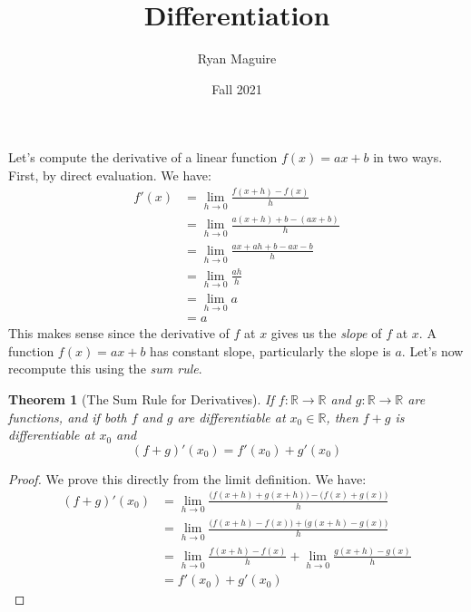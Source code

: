 \documentclass{article}
\title{Differentiation}
\author{Ryan Maguire}
\date{Fall 2021}
\theoremstyle{normal}
\theoremstyle{plain}
\newtheorem{theorem}{Theorem}
\begin{document}
    \maketitle
    Let's compute the derivative of a linear function $f(x)=ax+b$ in two ways.
    First, by direct evaluation. We have:
    \begin{align}
        f'(x)&=\lim_{h\rightarrow{0}}\frac{f(x+h)-f(x)}{h}\\
            &=\lim_{h\rightarrow{0}}\frac{a(x+h)+b-(ax+b)}{h}\\
            &=\lim_{h\rightarrow{0}}\frac{ax+ah+b-ax-b}{h}\\
            &=\lim_{h\rightarrow{0}}\frac{ah}{h}\\
            &=\lim_{h\rightarrow{0}}a\\
            &=a
    \end{align}
    This makes sense since the derivative of $f$ at $x$ gives us the
    \textit{slope} of $f$ at $x$. A function $f(x)=ax+b$ has constant slope,
    particularly the slope is $a$. Let's now recompute this using the
    \textit{sum rule}.
    \par\hfill\par
    \begin{theorem}[The Sum Rule for Derivatives]
        If $f:\mathbb{R}\rightarrow\mathbb{R}$ and
        $g:\mathbb{R}\rightarrow\mathbb{R}$ are functions, and if both
        $f$ and $g$ are differentiable at $x_{0}\in\mathbb{R}$, then
        $f+g$ is differentiable at $x_{0}$ and
        \begin{equation}
            (f+g)'(x_{0})=f'(x_{0})+g'(x_{0})
        \end{equation}
    \end{theorem}
    \begin{proof}
        We prove this directly from the limit definition. We have:
        \begin{align}
            (f+g)'(x_{0})
                &=\lim_{h\rightarrow{0}}
                    \frac{\big(f(x+h)+g(x+h)\big)-\big(f(x)+g(x)\big)}{h}\\
                &=\lim_{h\rightarrow{0}}
                    \frac{\big(f(x+h)-f(x)\big)+\big(g(x+h)-g(x)\big)}{h}\\
                &=\lim_{h\rightarrow{0}}\frac{f(x+h)-f(x)}{h}+
                    \lim_{h\rightarrow{0}}\frac{g(x+h)-g(x)}{h}\\
                &=f'(x_{0})+g'(x_{0})
        \end{align}
    \end{proof}
\end{document}
